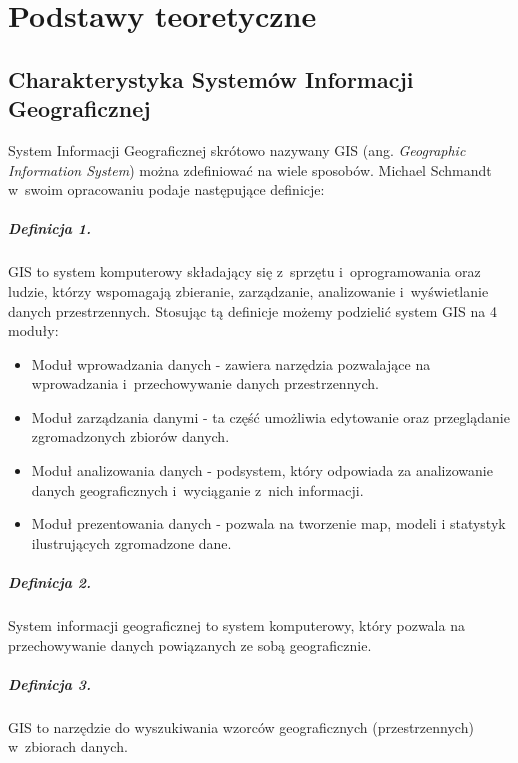\documentclass[archivemode]{mgr}
\begin{document}
\chapter{Podstawy teoretyczne}

\section{Charakterystyka Systemów Informacji Geograficznej}
System Informacji Geograficznej skrótowo nazywany GIS (ang. \textit{Geographic Information System}) można zdefiniować na wiele sposobów. Michael Schmandt w~swoim opracowaniu \cite{gis_introduction} podaje następujące definicje:

\paragraph*{Definicja 1.}
GIS to system komputerowy składający się z~sprzętu i~oprogramowania oraz ludzie, którzy wspomagają zbieranie, zarządzanie, analizowanie i~wyświetlanie danych przestrzennych. Stosując tą definicje możemy podzielić system GIS na 4 moduły:

  \begin{itemize}
    \item Moduł wprowadzania danych - zawiera narzędzia pozwalające na wprowadzania i~przechowywanie danych przestrzennych.
    \item Moduł zarządzania danymi - ta część umożliwia edytowanie oraz przeglądanie zgromadzonych zbiorów danych.
    \item Moduł analizowania danych - podsystem, który odpowiada za analizowanie danych geograficznych i~wyciąganie z~nich informacji.
    \item Moduł prezentowania danych - pozwala na tworzenie map, modeli i statystyk ilustrujących zgromadzone dane.
  \end{itemize}

\paragraph*{Definicja 2.}
System informacji geograficznej to system komputerowy, który pozwala na przechowywanie danych powiązanych ze sobą geograficznie.

\paragraph*{Definicja 3.}
GIS to narzędzie do wyszukiwania wzorców geograficznych (przestrzennych) w~zbiorach danych.
\end{document}
